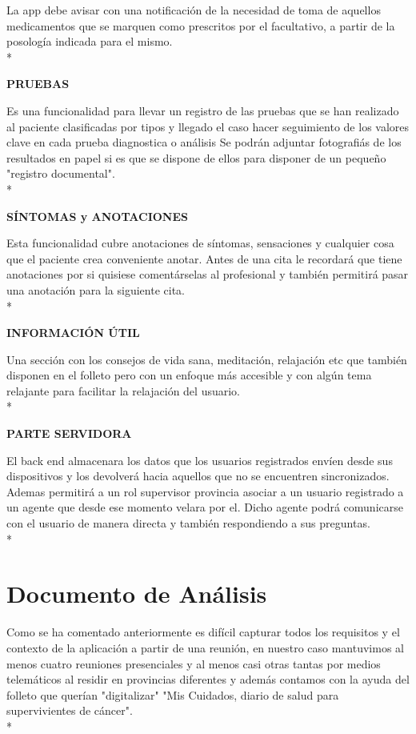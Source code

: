 \documentclass[../pfc.tex]{subfiles}
\begin{document}
	La app debe avisar con una notificación de la necesidad de toma de aquellos medicamentos que se marquen como prescritos por el facultativo, a partir de la posología indicada para el mismo. \\*

	\textbf{PRUEBAS}
	
	Es una funcionalidad para llevar un registro de las pruebas que se han realizado al paciente clasificadas por tipos y llegado el caso hacer seguimiento de los valores clave en cada prueba diagnostica o análisis Se podrán adjuntar fotografiás de los resultados en papel si es que se dispone de ellos para disponer de un pequeño "registro documental".\\*
	
	\textbf{SÍNTOMAS y ANOTACIONES}
	
	Esta funcionalidad cubre anotaciones de síntomas, sensaciones y cualquier cosa que el paciente crea conveniente anotar. Antes de una cita le recordará que tiene anotaciones por si quisiese comentárselas al profesional y también permitirá pasar una anotación para la siguiente cita.\\*

	\textbf{INFORMACIÓN ÚTIL}
	
	Una sección con los consejos de vida sana, meditación, relajación etc que también disponen en el folleto pero con un enfoque más accesible y con algún tema relajante para facilitar la relajación del usuario.\\* 
	
	\textbf{PARTE SERVIDORA}

	El back end almacenara los datos que los usuarios registrados envíen desde sus dispositivos y los devolverá hacia aquellos que no se encuentren sincronizados. Ademas permitirá a un rol supervisor provincia asociar a un usuario registrado a un agente que desde ese momento velara por el. Dicho agente podrá comunicarse con el usuario de manera directa y también respondiendo a sus preguntas.\\*  

	\clearpage
	
	\section{Documento de Análisis}

	Como se ha comentado anteriormente es difícil capturar todos los requisitos y el contexto de la aplicación a partir de una reunión, en nuestro caso mantuvimos al menos cuatro reuniones presenciales y al menos casi otras tantas por medios telemáticos al residir en provincias diferentes y además contamos con la ayuda del folleto que querían "digitalizar" "Mis Cuidados, diario de salud para supervivientes de cáncer".\\*
			
\end{document}
